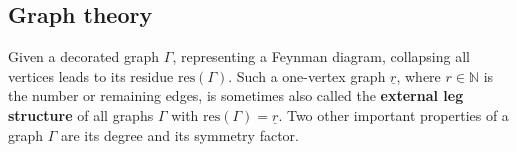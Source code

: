 \subsection{Graph theory}

    Given a decorated graph $\Gamma$, representing a Feynman diagram, collapsing all vertices leads to its residue $\mathrm{res}(\Gamma)$. Such a one-vertex graph $\underline{r}$, where $r\in\mathbb{N}$ is the number or remaining edges, is sometimes also called the \textbf{external leg structure} of all graphs $\Gamma$ with $\mathrm{res}(\Gamma)=\underline{r}$. Two other important properties of a graph $\Gamma$ are its degree and its symmetry factor.



